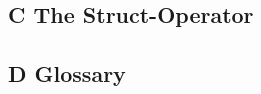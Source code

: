 \documentclass[twoside,11pt]{article}
\begin{document}
\subsection*{C The Struct-Operator}


\newpage
\subsection*{D Glossary}

%

\newpage


\end{document}
